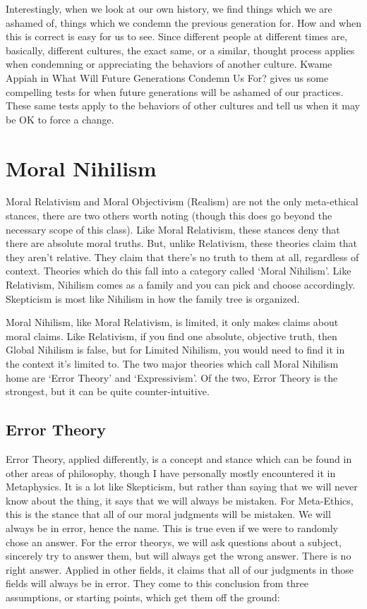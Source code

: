 Interestingly, when we look at our own history, we find things which we are ashamed of, things which we condemn the previous generation for. How and when this is correct is easy for us to see. Since different people at different times are, basically, different cultures, the exact same, or a similar, thought process applies when condemning or appreciating the behaviors of another culture. Kwame Appiah in What Will Future Generations Condemn Us For?\autocite{Appiah1} gives us some compelling tests for when future generations will be ashamed of our practices. These same tests apply to the behaviors of other cultures and tell us when it may be OK to force a change. 

\section{Moral Nihilism}

Moral Relativism and Moral Objectivism (Realism) are not the only meta-ethical stances, there are two others worth noting (though this does go beyond the necessary scope of this class). Like Moral Relativism, these stances deny that there are absolute moral truths. But, unlike Relativism, these theories claim that they aren't relative. They claim that there's no truth to them at all, regardless of context. Theories which do this fall into a category called `Moral Nihilism'. Like Relativism, Nihilism comes as a family and you can pick and choose accordingly. Skepticism is most like Nihilism in how the family tree is organized. 

Moral Nihilism, like Moral Relativism, is limited, it only makes claims about moral claims. Like Relativism, if you find one absolute, objective truth, then Global Nihilism is false, but for Limited Nihilism, you would need to find it in the context it's limited to. The two major theories which call Moral Nihilism home are `Error Theory' and `Expressivism'. Of the two, Error Theory is the strongest, but it can be quite counter-intuitive. 

\subsection{Error Theory}

Error Theory, applied differently, is a concept and stance which can be found in other areas of philosophy, though I have personally mostly encountered it in Metaphysics. It is a lot like Skepticism, but rather than saying that we will never know about the thing, it says that we will always be mistaken.  For Meta-Ethics, this is the stance that all of our moral judgments will be mistaken. We will always be in error, hence the name. This is true even if we were to randomly chose an answer. For the \glspl{error theory}, we will ask questions about a subject, sincerely try to answer them, but will always get the wrong answer. There is no right answer.  Applied in other fields, it claims that all of our judgments in those fields will always be in error. They come to this conclusion from three assumptions, or starting points, which get them off the ground:

